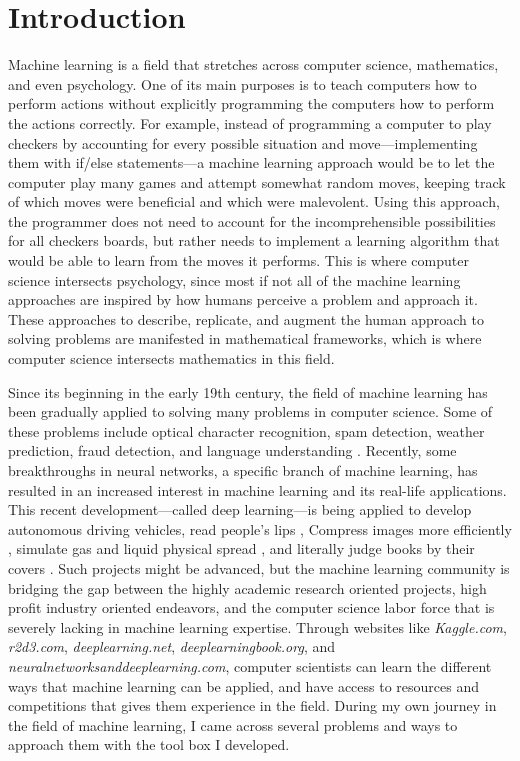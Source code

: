 \section{Introduction}
Machine learning is a field that stretches across computer science, mathematics, and even psychology. One of its main purposes is to teach computers how to perform actions without explicitly programming the computers how to perform the actions correctly. For example, instead of programming a computer to play checkers by accounting for every possible situation and move---implementing them with if/else statements---a machine learning approach would be to let the computer play many games and attempt somewhat random moves, keeping track of which moves were beneficial and which were malevolent. Using this approach, the programmer does not need to account for the incomprehensible possibilities for all checkers boards, but rather needs to implement a learning algorithm that would be able to learn from the moves it performs. This is where computer science intersects psychology, since most if not all of the machine learning approaches are inspired by how humans perceive a problem and approach it. These approaches to describe, replicate, and augment the human approach to solving problems are manifested in mathematical frameworks, which is where computer science intersects mathematics in this field. 

Since its beginning in the early 19th century, the field of machine learning has been gradually applied to solving many problems in computer science. Some of these problems include optical character recognition, spam detection, weather prediction, fraud detection, and language understanding \cite{RobSchapire}. Recently, some breakthroughs in neural networks, a specific branch of machine learning, has resulted in an increased interest in machine learning and its real-life applications. This recent development---called deep learning---is being applied to develop autonomous driving vehicles, read people's lips \cite{assael2016lipnet}, Compress images more efficiently \cite{Lucas20016}, simulate gas and liquid physical spread \cite{tompson2016accelerating}, and literally judge books by their covers \cite{Iwana2016}. Such projects might be advanced, but the machine learning community is bridging the gap between the highly academic research oriented projects, high profit industry oriented endeavors, and the computer science labor force that is severely lacking in machine learning expertise. Through websites like \textit{Kaggle.com}, \textit{r2d3.com}, \textit{deeplearning.net}, \textit{deeplearningbook.org}, and \textit{neuralnetworksanddeeplearning.com}, computer scientists can learn the different ways that machine learning can be applied, and have access to resources and competitions that gives them experience in the field. During my own journey in the field of machine learning, I came across several problems and ways to approach them with the tool box I developed.

